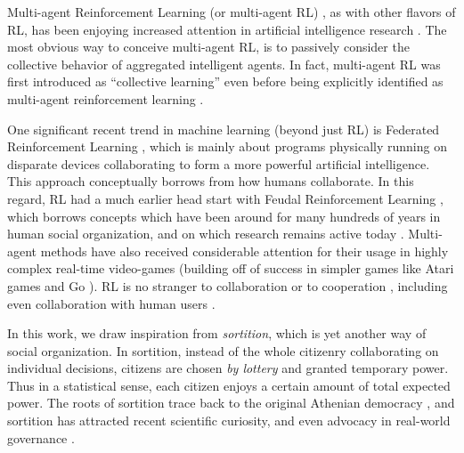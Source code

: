 \documentclass[twoside]{article}
\begin{document}
Multi-agent Reinforcement Learning (or multi-agent RL) \cite{collective-1993,multiagent-1994-most-cited,multiagent-2021-most-cited,hernandez2011more}, as with other flavors of RL, has been enjoying increased attention in artificial intelligence research \cite{unified-multiagent}.
The most obvious way to conceive multi-agent RL, is to passively consider the collective behavior of aggregated intelligent agents.
In fact, multi-agent RL was first introduced as ``collective learning'' \cite{collective-1993} even before being explicitly identified as multi-agent reinforcement learning \cite{multiagent-1994-most-cited}.


One significant recent trend in machine learning (beyond just RL)
is Federated Reinforcement Learning \cite{federated-learning-2021},
which is mainly about programs physically running on disparate devices collaborating to form a more powerful artificial intelligence. This approach conceptually borrows from how humans collaborate.
In this regard, RL had a much earlier head start with
Feudal Reinforcement Learning \cite{feudal-1992}, which borrows concepts which have been around for many hundreds of years in human social organization, and on which research remains active today \cite{Johnson2020FeudalSH}.
Multi-agent methods have also received considerable attention for their usage
in highly complex real-time video-games \cite{nature-starcraft}
(building off of success in simpler games like Atari games
\cite{nature-ATARI} and Go \cite{nature-go-2}).
RL is no stranger to
collaboration \cite{Kok2006CollaborativeMR} or to
cooperation \cite{Qiu2021RMIXLR}, including even collaboration with
human users \cite{collab-other}.

In this work, we draw inspiration from \emph{sortition}, which is yet another way of social organization. In sortition, instead of the whole citizenry collaborating on individual
decisions, citizens are chosen \emph{by lottery} and granted temporary power. Thus in a
statistical sense, each citizen enjoys a certain amount of total expected power.
The roots of sortition trace back to the original Athenian democracy \cite{sortition-ancient},
and sortition has attracted recent scientific curiosity, and even advocacy in real-world governance \cite{nature-sortition,Sintomer2018FromDT,sortition-2013}.
\end{document}
